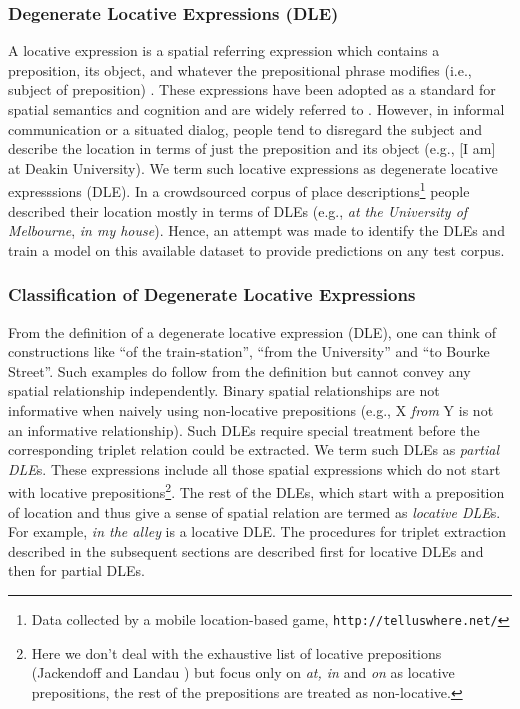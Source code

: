 \documentclass{acm_proc_article-sp}
\begin{document}
\subsubsection{Degenerate Locative Expressions (DLE)}
\label{DLE}
A locative expression is a spatial referring expression which contains a preposition, its object, and whatever the prepositional phrase modifies (i.e., subject of preposition) \cite{herskovits:pragmatics}. These expressions have been adopted as a standard for spatial semantics and cognition and are widely referred to \cite{olivier:semantics,zlatev:semantics}. However, in informal communication or a situated dialog, people tend to disregard the subject and describe the location in terms of just the preposition and its object (e.g., [I am] at Deakin University). We term such locative expressions as degenerate locative expresssions (DLE). In a crowdsourced corpus of place descriptions\footnote{Data collected by a mobile location-based game, \texttt{http://telluswhere.net/}} people described their location mostly in terms of DLEs (e.g., \textit{at the University of Melbourne}, \textit{in my house}). Hence, an attempt was made to identify the DLEs and train a model on this available dataset to provide predictions on any test corpus.
\newpage
\subsubsection*{Classification of Degenerate Locative Expressions}
From the definition of a degenerate locative expression (DLE), one can think of constructions like ``of the train-station'', ``from the University'' and ``to Bourke Street''. Such examples do follow from the definition but cannot convey any spatial relationship independently. Binary spatial relationships are not informative when naively using non-locative prepositions (e.g., X \textit{from} Y is not an informative relationship). Such DLEs require special treatment before the corresponding triplet relation could be extracted. We term such DLEs as \textit{partial DLE}s. These expressions include all those spatial expressions which do not start with locative prepositions\footnote{Here we don't deal with the exhaustive list of locative prepositions (Jackendoff and Landau \cite{landau:and}) but focus only on \textit{at, in} and \textit{on} as locative prepositions, the rest of the prepositions are treated as non-locative.}.
The rest of the DLEs, which start with a preposition of location and thus give a sense of spatial relation are termed as \textit{locative DLE}s. For example, \textit{in the alley} is a locative DLE. The procedures for triplet extraction described in the subsequent sections are described first for locative DLEs and then for partial DLEs.
\end{document}
